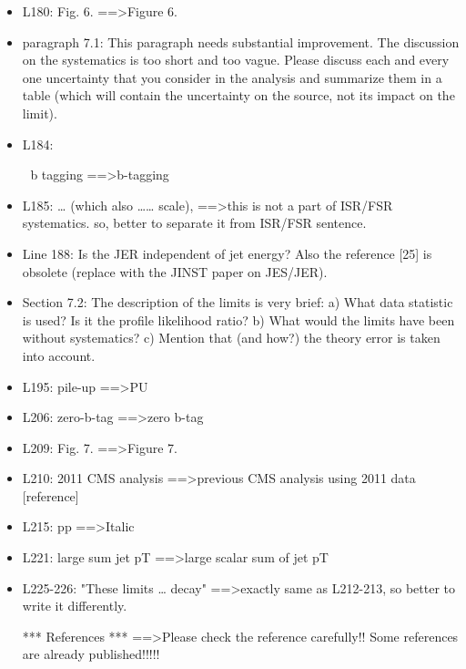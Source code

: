 \documentclass[paper=a4, fontsize=11pt]{scrartcl}
\begin{document}
\begin{itemize}
\item L180: 
Fig. 6. ==\textgreater Figure 6. 


\item paragraph 7.1: 
This paragraph needs substantial improvement. The discussion on the 
systematics is too short and too vague. Please discuss each and every one 
uncertainty that you consider in the analysis and summarize them in a table 
(which will contain the uncertainty on the source, not its impact on the 
limit). 


\item L184: 



b tagging ==\textgreater b-tagging 


\item L185: … (which also …… scale), ==\textgreater this is not a part of ISR/FSR 
systematics. so, better to separate it from ISR/FSR sentence. 


\item Line 188: 
Is the JER independent of jet energy? Also the reference [25] is obsolete 
(replace with the JINST paper on JES/JER). 


\item Section 7.2: 
The description of the limits is very brief: 
a) What data statistic is used? Is it the profile likelihood ratio? 
b) What would the limits have been without systematics? 
c) Mention that (and how?) the theory error is taken into account. 


\item L195: 
pile-up ==\textgreater PU 


\item L206: 
zero-b-tag ==\textgreater zero b-tag 


\item L209: 
Fig. 7. ==\textgreater Figure 7. 


\item L210: 
2011 CMS analysis ==\textgreater previous CMS analysis using 2011 data [reference] 


\item L215: 
pp ==\textgreater Italic 


\item L221: 
large sum jet pT ==\textgreater large scalar sum of jet pT 


\item L225-226: 
"These limits … decay" ==\textgreater exactly same as L212-213, so better to write it 
differently. 


*** References *** 
==\textgreater Please check the reference carefully!! Some references are already 
published!!!!! 



\end{itemize}
\end{document}
